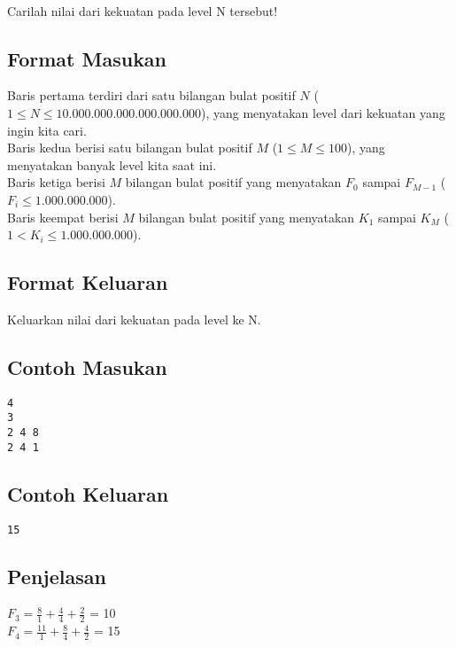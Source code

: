 \documentclass{article}
\begin{document}
\\
Carilah nilai dari kekuatan pada level N tersebut!

\subsection*{Format Masukan}

Baris pertama terdiri dari satu bilangan bulat positif $N$ ($1 \leq N \leq 10.000.000.000.000.000.000$), yang menyatakan level dari kekuatan yang ingin kita cari.\\
Baris kedua berisi satu bilangan bulat positif $M$ ($1 \leq M \leq 100$), yang menyatakan banyak level kita saat ini.\\
Baris ketiga berisi $M$ bilangan bulat positif yang menyatakan $F_0$ sampai $F_{M-1}$ ($F_i \leq 1.000.000.000$).\\
Baris keempat berisi $M$ bilangan bulat positif yang menyatakan $K_1$ sampai $K_{M}$ ($ 1 < K_i \leq 1.000.000.000 $).\\

\subsection*{Format Keluaran}

Keluarkan nilai dari kekuatan pada level ke N.
\\

\begin{multicols}{2}
\subsection*{Contoh Masukan}
\begin{lstlisting}
4
3
2 4 8
2 4 1
\end{lstlisting}
\columnbreak
\subsection*{Contoh Keluaran}
\begin{lstlisting}
15
\end{lstlisting}
\vfill
\null
\end{multicols}

\subsection*{Penjelasan}
\(F_3   = \frac{8}{1} + \frac{4}{4} + \frac{2}{2}\) = 10\\



\(F_4   = \frac{11}{1} + \frac{8}{4} + \frac{4}{2}\) = 15

\pagebreak
\end{document}
